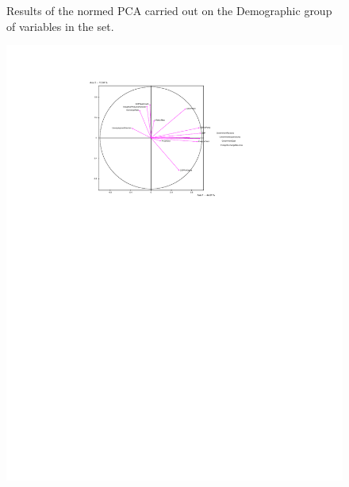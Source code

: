 \documentclass[a4paper,10pt,twocolumn]{article}
\begin{document}
\begin{figure}[!ht]
\begin{center}
\caption{\footnotesize{Results of the normed PCA carried out on the Demographic group of variables in the set.}\label{p1}}
\end{center}
\end{figure}

\begin{figure}[!ht]
\begin{center}
\includegraphics[width=16cm]{p2a.pdf}

\end{center}
\end{figure}
\end{document}
